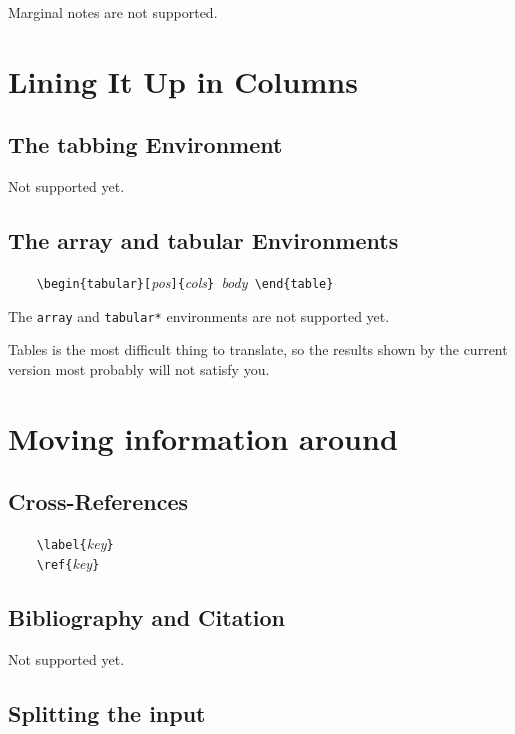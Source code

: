 Marginal notes are not supported.

\section{Lining It Up in Columns}

\subsection{The tabbing Environment}

Not supported yet.

\subsection{The array and tabular Environments}

\verb'    \begin{tabular}['{\it pos}\verb']{'{\it cols}\verb'} '{\it body}\verb' \end{table}'

The \verb'array' and \verb'tabular*' environments are not supported yet.

Tables is the most difficult thing to translate, so the results
shown by the current version most probably will not satisfy you.

\section{Moving information around}

\subsection{Cross-References}

\verb'    \label{'{\it key}\verb'}'  \\
\verb'    \ref{'{\it key}\verb'}'    \\


\subsection{Bibliography and Citation}

Not supported yet.

\subsection{Splitting the input}

